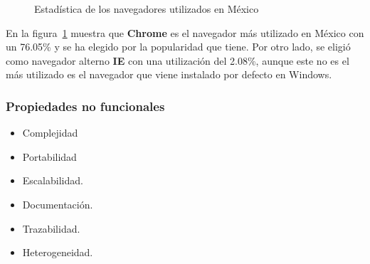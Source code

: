 		\begin{figure}[htbp!]
			\begin{center}
				\caption{Estadística de los navegadores utilizados en México}
				\label{fig:navegadores}
			\end{center}
		\end{figure}
		
		En la figura~\ref{fig:navegadores} muestra que \textbf{Chrome} es el navegador más utilizado en México con un 76.05\% y se ha elegido por la popularidad que tiene. Por otro lado, se eligió como navegador alterno \textbf{IE} con una utilización del 2.08\%, aunque este no es el más utilizado es el navegador que viene instalado por defecto en Windows.
		
	
	\subsubsection{Propiedades no funcionales}
		\begin{itemize}
			\item Complejidad
			
			\item Portabilidad
						
			\item Escalabilidad.
			
			\item Documentación.
			
			\item Trazabilidad.
			
			\item Heterogeneidad.	
		\end{itemize}